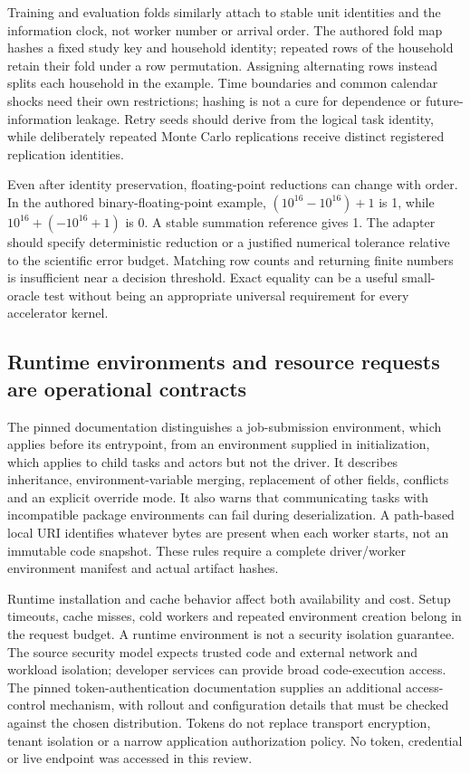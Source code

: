 Training and evaluation folds similarly attach to stable unit identities and the information clock, not worker number or arrival order. The authored fold map hashes a fixed study key and household identity; repeated rows of the household retain their fold under a row permutation. Assigning alternating rows instead splits each household in the example. Time boundaries and common calendar shocks need their own restrictions; hashing is not a cure for dependence or future-information leakage. Retry seeds should derive from the logical task identity, while deliberately repeated Monte Carlo replications receive distinct registered replication identities.

Even after identity preservation, floating-point reductions can change with order. In the authored binary-floating-point example, $(10^{16}-10^{16})+1$ is 1, while $10^{16}+(-10^{16}+1)$ is 0. A stable summation reference gives 1. The adapter should specify deterministic reduction or a justified numerical tolerance relative to the scientific error budget. Matching row counts and returning finite numbers is insufficient near a decision threshold. Exact equality can be a useful small-oracle test without being an appropriate universal requirement for every accelerator kernel.\citep{exec24_ray_contract}

\subsection{Runtime environments and resource requests are operational contracts}
The pinned documentation distinguishes a job-submission environment, which applies before its entrypoint, from an environment supplied in initialization, which applies to child tasks and actors but not the driver. It describes inheritance, environment-variable merging, replacement of other fields, conflicts and an explicit override mode. It also warns that communicating tasks with incompatible package environments can fail during deserialization. A path-based local URI identifies whatever bytes are present when each worker starts, not an immutable code snapshot. These rules require a complete driver/worker environment manifest and actual artifact hashes.\citep{exec24_ray_sources}

Runtime installation and cache behavior affect both availability and cost. Setup timeouts, cache misses, cold workers and repeated environment creation belong in the request budget. A runtime environment is not a security isolation guarantee. The source security model expects trusted code and external network and workload isolation; developer services can provide broad code-execution access. The pinned token-authentication documentation supplies an additional access-control mechanism, with rollout and configuration details that must be checked against the chosen distribution. Tokens do not replace transport encryption, tenant isolation or a narrow application authorization policy. No token, credential or live endpoint was accessed in this review.\citep{exec24_ray_sources}

